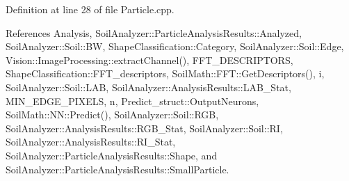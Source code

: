 Definition at line 28 of file Particle.\+cpp.



References Analysis, Soil\+Analyzer\+::\+Particle\+Analysis\+Results\+::\+Analyzed, Soil\+Analyzer\+::\+Soil\+::\+B\+W, Shape\+Classification\+::\+Category, Soil\+Analyzer\+::\+Soil\+::\+Edge, Vision\+::\+Image\+Processing\+::extract\+Channel(), F\+F\+T\+\_\+\+D\+E\+S\+C\+R\+I\+P\+T\+O\+R\+S, Shape\+Classification\+::\+F\+F\+T\+\_\+descriptors, Soil\+Math\+::\+F\+F\+T\+::\+Get\+Descriptors(), i, Soil\+Analyzer\+::\+Soil\+::\+L\+A\+B, Soil\+Analyzer\+::\+Analysis\+Results\+::\+L\+A\+B\+\_\+\+Stat, M\+I\+N\+\_\+\+E\+D\+G\+E\+\_\+\+P\+I\+X\+E\+L\+S, n, Predict\+\_\+struct\+::\+Output\+Neurons, Soil\+Math\+::\+N\+N\+::\+Predict(), Soil\+Analyzer\+::\+Soil\+::\+R\+G\+B, Soil\+Analyzer\+::\+Analysis\+Results\+::\+R\+G\+B\+\_\+\+Stat, Soil\+Analyzer\+::\+Soil\+::\+R\+I, Soil\+Analyzer\+::\+Analysis\+Results\+::\+R\+I\+\_\+\+Stat, Soil\+Analyzer\+::\+Particle\+Analysis\+Results\+::\+Shape, and Soil\+Analyzer\+::\+Particle\+Analysis\+Results\+::\+Small\+Particle.


